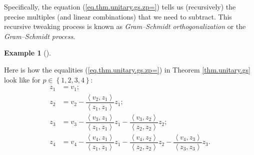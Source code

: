 \documentclass[numbers=enddot,12pt,final,onecolumn,notitlepage]{scrartcl}%
\numberwithin{exer}{subsection}
\theoremstyle{definition}
\newtheorem{exam}[theo]{Example}
\newenvironment{example}[1][]
{\begin{exam}[#1]\begin{leftbar}}
{\end{leftbar}\end{exam}}
\begin{document}
\noindent Specifically, the equation (\ref{eq.thm.unitary.gs.zp=}) tells us
(recursively) the precise multiples (and linear combinations) that we need to
subtract. This recursive tweaking process is known as \emph{Gram--Schmidt
orthogonalization} or the \emph{Gram--Schmidt process}.

\begin{example}
Here is how the equalities (\ref{eq.thm.unitary.gs.zp=}) in Theorem
\ref{thm.unitary.gs} look like for $p\in\left\{  1,2,3,4\right\}  $:%
\begin{align*}
z_{1}  &  =v_{1};\\
z_{2}  &  =v_{2}-\dfrac{\left\langle v_{2},z_{1}\right\rangle }{\left\langle
z_{1},z_{1}\right\rangle }z_{1};\\
z_{3}  &  =v_{3}-\dfrac{\left\langle v_{3},z_{1}\right\rangle }{\left\langle
z_{1},z_{1}\right\rangle }z_{1}-\dfrac{\left\langle v_{3},z_{2}\right\rangle
}{\left\langle z_{2},z_{2}\right\rangle }z_{2};\\
z_{4}  &  =v_{4}-\dfrac{\left\langle v_{4},z_{1}\right\rangle }{\left\langle
z_{1},z_{1}\right\rangle }z_{1}-\dfrac{\left\langle v_{4},z_{2}\right\rangle
}{\left\langle z_{2},z_{2}\right\rangle }z_{2}-\dfrac{\left\langle v_{4}%
,z_{3}\right\rangle }{\left\langle z_{3},z_{3}\right\rangle }z_{3}.
\end{align*}

\end{example}
\end{document}
